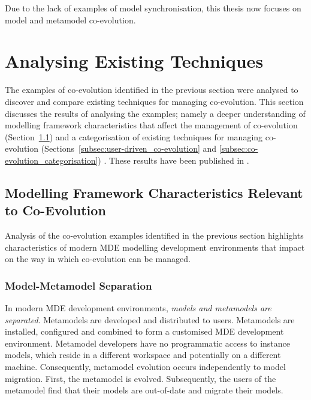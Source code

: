 Due to the lack of examples of model synchronisation, this thesis now focuses on model and metamodel co-evolution. 



\section{Analysing Existing Techniques}
\label{sec:analysing_existing_techniques}
The examples of co-evolution identified in the previous section were analysed to discover and compare existing techniques for managing co-evolution. This section discusses the results of analysing the examples; namely a deeper understanding of modelling framework characteristics that affect the management of co-evolution (Section~\ref{subsec:modelling_framework_characteristics}) and a categorisation of existing techniques for managing co-evolution (Sections~\ref{subsec:user-driven_co-evolution} and \ref{subsec:co-evolution_categorisation}) . These results have been published in \cite{rose09analysis,rose10flock}.


\subsection{Modelling Framework Characteristics Relevant to Co-Evolution}
\label{subsec:modelling_framework_characteristics}
Analysis of the co-evolution examples identified in the previous section highlights characteristics of modern MDE modelling development environments that impact on the way in which co-evolution can be managed.

\subsubsection{Model-Metamodel Separation}
In modern MDE development environments, \emph{models and metamodels are separated}. Metamodels are developed and distributed to users. Metamodels are installed, configured and combined to form a customised MDE development environment. Metamodel developers have no programmatic access to instance models, which reside in a different workspace and potentially on a different machine. Consequently, metamodel evolution occurs independently to model migration. First, the metamodel is evolved. Subsequently, the users of the metamodel find that their models are out-of-date and migrate their models.

